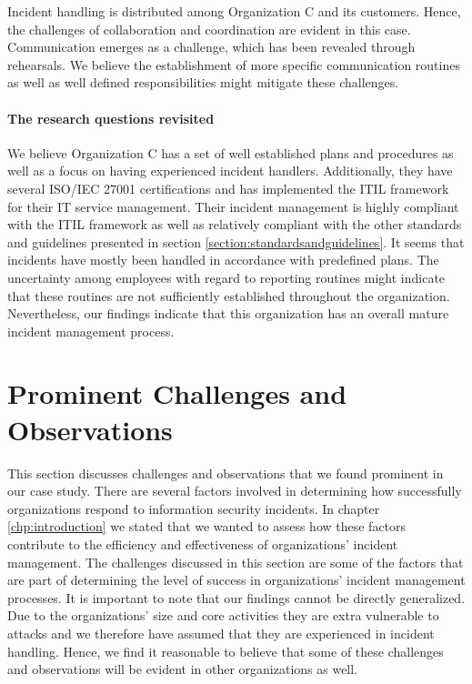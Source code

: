 Incident handling is distributed among Organization C and its customers. Hence, the challenges of collaboration and coordination are evident in this case. Communication emerges as a challenge, which has been revealed through rehearsals. We believe the establishment of more specific communication routines as well as well defined responsibilities might mitigate these challenges.

\paragraph{The research questions revisited}
We believe Organization C has a set of well established plans and procedures as well as a focus on having experienced incident handlers. Additionally, they have several ISO/IEC 27001 certifications and has implemented the ITIL framework for their IT service management. Their incident management is highly compliant with the ITIL framework as well as relatively compliant with the other standards and guidelines presented in section \ref{section:standardsandguidelines}. It seems that incidents have mostly been handled in accordance with predefined plans. The uncertainty among employees with regard to reporting routines might indicate that these routines are not sufficiently established throughout the organization. Nevertheless, our findings indicate that this organization has an overall mature incident management process. 

\section{Prominent Challenges and Observations}
\label{sec:discussionStructures}
This section discusses challenges and observations that we found prominent in our case study. There are several factors involved in determining how successfully organizations respond to information security incidents. In chapter \ref{chp:introduction} we stated that we wanted to assess how these factors contribute to the efficiency and effectiveness of organizations' incident management. The challenges discussed in this section are some of the factors that are part of determining the level of success in organizations' incident management processes. It is important to note that our findings cannot be directly generalized. Due to the organizations' size and core activities they are extra vulnerable to attacks and we therefore have assumed that they are experienced in incident handling. Hence, we find it reasonable to believe that some of these challenges and observations will be evident in other organizations as well.

